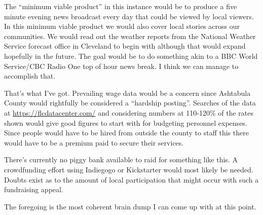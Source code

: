 The ``minimum viable product'' in this instance would be to produce a
five minute evening news broadcast every day that could be viewed by
local viewers. In this minimum viable product we would also cover local
stories across our communities. We would read out the weather reports
from the National Weather Service forecast office in Cleveland to begin
with although that would expand hopefully in the future. The goal would
be to do something akin to a BBC World Service/CBC Radio One top of hour
news break. I think we can manage to accomplish that.

That's what I've got. Prevailing wage data would be a concern since
Ashtabula County would rightfully be considered a ``hardship posting''.
Searches of the data at \url{https://flcdatacenter.com/} and considering
numbers at 110-120\% of the rates shown would give good figures to start
with for budgeting personnel expenses. Since people would have to be
hired from outside the county to staff this there would have to be a
premium paid to secure their services.

There's currently no piggy bank available to raid for something like
this. A crowdfunding effort using Indiegogo or Kickstarter would most
likely be needed. Doubts exist as to the amount of local participation
that might occur with such a fundraising appeal.

The foregoing is the most coherent brain dump I can come up with at this
point.
